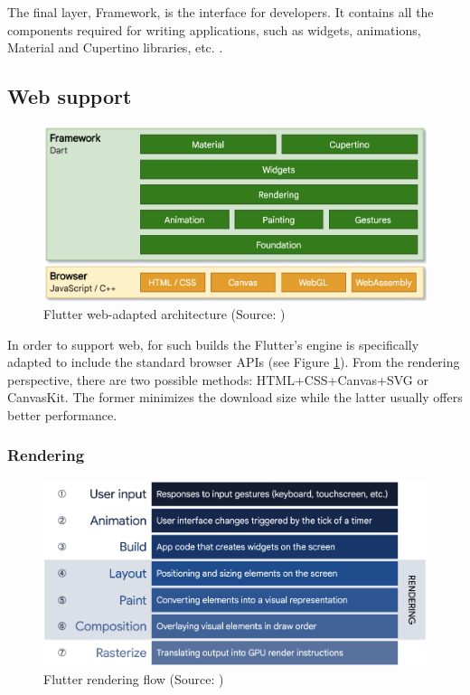 The final layer, Framework, is the interface for developers. It contains all the components required for writing applications, such as widgets, animations, Material and Cupertino libraries, etc. \cite{flutter_docs_architecture}. 

\subsection*{Web support}

\begin{figure}[h]
	\centering
	\includegraphics[width=.77\textwidth]{img/flutter_web_architecture}
	\caption{Flutter web-adapted architecture (Source: \cite{flutter_docs_architecture})}
	\label{fig:flutter_web_architecture}
\end{figure}

In order to support web, for such builds the Flutter's engine is specifically adapted to include the standard browser APIs (see Figure \ref{fig:flutter_web_architecture}). From the rendering perspective, there are two possible methods: HTML+CSS+Canvas+SVG or CanvasKit. The former minimizes the download size while the latter usually offers better performance.

\subsubsection*{Rendering}

\begin{figure}[h]
	\centering
	\includegraphics[width=\textwidth]{img/flutter_render_pipeline}
	\caption{Flutter rendering flow (Source: \cite{flutter_docs_architecture})}
	\label{fig:flutter_render_flow}
\end{figure}

